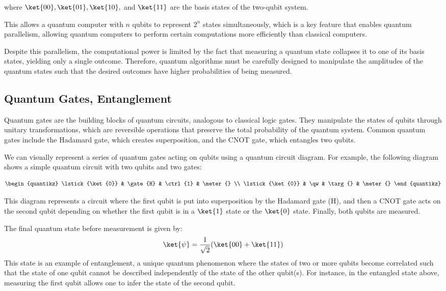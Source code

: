 where \( \ket{00}, \ket{01}, \ket{10}, \) and \( \ket{11} \) are the basis states of the two-qubit system.

This allows a quantum computer with \(n\) qubits to represent \(2^n\) states simultaneously, which is a key feature that enables quantum parallelism, allowing quantum computers to perform certain computations more efficiently than classical computers.

Despite this parallelism, the computational power is limited by the fact that measuring a quantum state collapses it to one of its basis states, yielding only a single outcome. Therefore, quantum algorithms must be carefully designed to manipulate the amplitudes of the quantum states such that the desired outcomes have higher probabilities of being measured.

\subsection{Quantum Gates, Entanglement}

Quantum gates are the building blocks of quantum circuits, analogous to classical logic gates. They manipulate the states of qubits through unitary transformations, which are reversible operations that preserve the total probability of the quantum system. Common quantum gates include the Hadamard gate, which creates superposition, and the CNOT gate, which entangles two qubits. 

We can visually represent a series of quantum gates acting on qubits using a quantum circuit diagram. For example, the following diagram shows a simple quantum circuit with two qubits and two gates:

$$\begin{quantikz}
    \lstick{\ket{0}} & \gate{H} & \ctrl{1} & \meter{} \\
    \lstick{\ket{0}} & \qw      & \targ{}  & \meter{}
\end{quantikz}$$

This diagram represents a circuit where the first qubit is put into superposition by the Hadamard gate (H), and then a CNOT gate acts on the second qubit depending on whether the first qubit is in a \(\ket{1}\) state or the \(\ket{0}\) state. Finally, both qubits are measured.

The final quantum state before measurement is given by:
$$\ket{\psi} = \frac{1}{\sqrt{2}}(\ket{00} + \ket{11})$$
This state is an example of entanglement, a unique quantum phenomenon where the states of two or more qubits become correlated such that the state of one qubit cannot be described independently of the state of the other qubit(s). For instance, in the entangled state above, measuring the first qubit allows one to infer the state of the second qubit.

